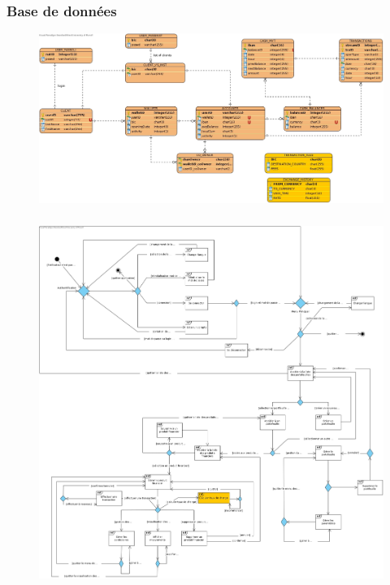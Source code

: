 \documentclass[../rapport.tex]{subfiles}
\begin{document}
\subsubsection{Base de données}
\begin{figure}[H]
    \includegraphics[scale=0.288]{ressources/photos_diagrammes/extensionUgo/ERD.jpg}
\end{figure}

\subsubsection{}
\begin{figure}[H]
    \includegraphics[scale=0.288]{ressources/photos_diagrammes/extensionUgo/interactionOverviewDiagramApp1.jpg}
\end{figure}
\end{document}
